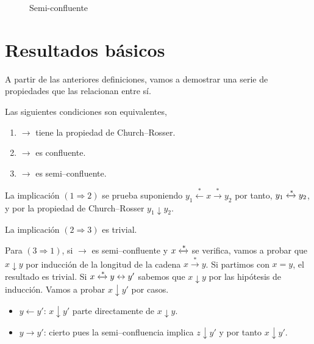 \begin{figure}[h]
  \centering
  \caption{Semi-confluente}
\end{figure}

\section{Resultados básicos}

A partir de las anteriores definiciones, vamos a demostrar una serie
de propiedades que las relacionan entre sí.

\begin{teor} \label{teor:conflu}
  Las siguientes condiciones son equivalentes,
  \begin{enumerate}
  \item $\rightarrow$ tiene la propiedad de Church--Rosser.
  \item $\rightarrow$ es confluente.
  \item $\rightarrow$ es semi--confluente.
  \end{enumerate}
\end{teor}

\begin{demo}
  La implicación $(1 \Rightarrow 2)$ se prueba suponiendo
  $y_1 \xleftarrow{*} x \xrightarrow{*} y_2$ por tanto,
  $y_1 \xleftrightarrow{*} y_2$, y por la propiedad de Church--Rosser
  $y_1 \downarrow y_2$.  

  La implicación $(2 \Rightarrow 3)$ es trivial.

  Para $(3 \Rightarrow 1)$, si $\rightarrow$ es semi--confluente y
  $x \xleftrightarrow{*}$ se verifica, vamos a probar que
  $x \downarrow y$ por inducción de la longitud de la cadena
  $x \xrightarrow{*} y$.  Si partimos con $x = y$, el resultado es
  trivial. Si $x \xleftrightarrow{*} y \leftrightarrow y'$ sabemos que
  $x \downarrow y$ por las hipótesis de inducción. Vamos a probar
  $x \downarrow y'$ por casos.
  \begin{itemize}
  \item $y \leftarrow y'$: $x \downarrow y'$ parte directamente de
    $x \downarrow y$.
  \item $y \rightarrow y'$: cierto pues la semi--confluencia implica
    $z \downarrow y'$ y por tanto $x \downarrow y'$.
  \end{itemize}
\end{demo}

